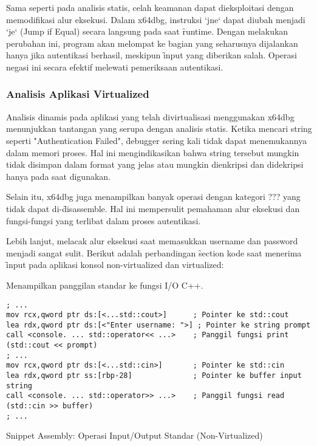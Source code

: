 Sama seperti pada analisis statis, celah keamanan dapat dieksploitasi dengan memodifikasi alur eksekusi. Dalam x64dbg, instruksi `jne` dapat diubah menjadi `je` (Jump if Equal) secara langsung pada saat \f{runtime}. Dengan melakukan perubahan ini, program akan melompat ke bagian yang seharusnya dijalankan hanya jika autentikasi berhasil, meskipun \f{input} yang diberikan salah. Operasi negasi ini secara efektif melewati pemeriksaan autentikasi.

\subsubsection{Analisis Aplikasi Virtualized}

Analisis dinamis pada aplikasi yang telah divirtualisasi menggunakan x64dbg menunjukkan tantangan yang serupa dengan analisis statis. Ketika mencari string seperti "Authentication Failed", \f{debugger} sering kali tidak dapat menemukannya dalam memori proses. Hal ini mengindikasikan bahwa string tersebut mungkin tidak disimpan dalam format yang jelas atau mungkin dienkripsi dan didekripsi hanya pada saat digunakan.

Selain itu, x64dbg juga menampilkan banyak operasi dengan kategori ??? yang tidak dapat di-\f{disassemble}. Hal ini mempersulit pemahaman alur eksekusi dan fungsi-fungsi yang terlibat dalam proses autentikasi.

Lebih lanjut, melacak alur eksekusi saat memasukkan username dan password menjadi sangat sulit. Berikut adalah perbandingan \f{section} kode saat menerima \f{input} pada aplikasi konsol non-virtualized dan virtualized:


 Menampilkan panggilan standar ke fungsi I/O C++.
\begin{listing}[H]
    \begin{verbatim}
; ...
mov rcx,qword ptr ds:[<...std::cout>]      ; Pointer ke std::cout
lea rdx,qword ptr ds:[<"Enter username: ">] ; Pointer ke string prompt
call <console. ... std::operator<< ...>    ; Panggil fungsi print (std::cout << prompt)
; ...
mov rcx,qword ptr ds:[<...std::cin>]       ; Pointer ke std::cin
lea rdx,qword ptr ss:[rbp-28]              ; Pointer ke buffer input string
call <console. ... std::operator>> ...>    ; Panggil fungsi read (std::cin >> buffer)
; ...
\end{verbatim}
\caption{Snippet Assembly: Operasi Input/Output Standar (Non-Virtualized)}
\label{lst:asm_dynamic_io_nonvirt_snippet} %
\end{listing}


